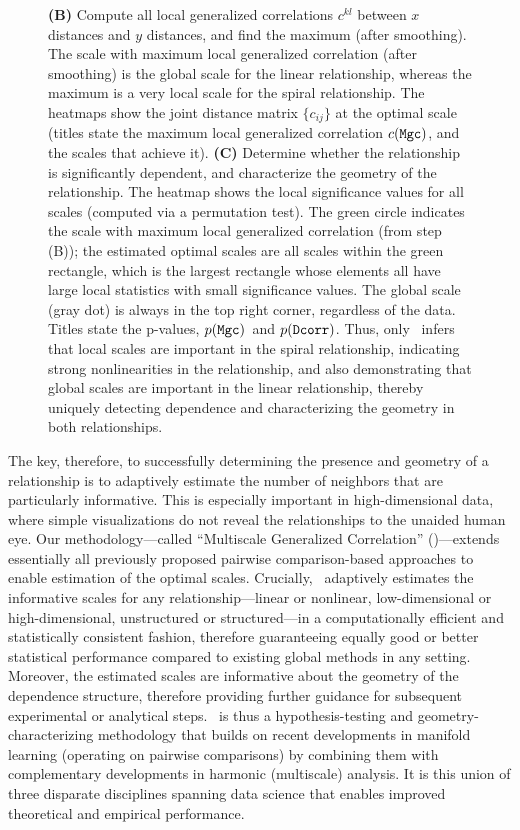 \documentclass[11pt]{extarticle}
\begin{document}
\begin{figure}
{%
\textbf{(B)} Compute all local generalized correlations $c^{kl}$ between $x$ distances and $y$ distances, and find the maximum (after smoothing).
The scale with maximum local generalized correlation (after smoothing) is the global scale for the linear relationship, whereas the maximum is a very local scale for the spiral relationship. The heatmaps show the joint distance matrix $\{c_{ij}\}$ at the optimal scale (titles state the maximum local generalized correlation $c({\sc \texttt{Mgc}})$, and the scales that achieve it).
\textbf{(C)}
Determine whether the relationship is significantly dependent, and characterize the geometry of the relationship.
The heatmap shows the local  significance values for all scales (computed via a permutation test). The green circle indicates the scale with maximum local generalized correlation (from step (B));  the estimated optimal scales are all scales within the green rectangle, which is the largest rectangle whose elements all have large local statistics with small significance values. The global scale (gray dot) is always in the top right corner, regardless of the data.
Titles state the p-values,  $p({\sc \texttt{Mgc}})$~and $p({\sc \texttt{Dcorr}})$.
Thus, only \Mgc~infers that local scales are important in the spiral relationship, indicating strong nonlinearities in the relationship,
 and also demonstrating that global scales are important in the linear relationship,  thereby uniquely detecting dependence and characterizing the geometry in both relationships.
}
\label{f:newschem}
\end{figure}

The key, therefore, to successfully determining the presence and geometry of a relationship is to adaptively estimate the number of neighbors that are particularly informative.
This is especially important in high-dimensional data, where simple visualizations do not reveal the relationships to the unaided human eye.
Our methodology---called ``Multiscale Generalized Correlation'' (\Mgc)---extends essentially all previously proposed pairwise comparison-based approaches to enable estimation of the  optimal scales.
Crucially, \Mgc~adaptively estimates the informative scales for any relationship---linear or nonlinear, low-dimensional or high-dimensional, unstructured or structured---in a computationally efficient and statistically consistent fashion, therefore guaranteeing equally good or better  statistical performance compared to existing global methods in any setting.
Moreover, the estimated scales are informative about the geometry of the dependence structure, therefore providing further guidance for subsequent experimental or analytical steps. \Mgc~is thus a hypothesis-testing and geometry-characterizing methodology that builds on recent developments in manifold learning (operating on pairwise comparisons) by combining them with complementary developments in harmonic (multiscale) analysis.
It is this union of three disparate disciplines spanning data science that enables improved theoretical and empirical performance.
\end{document}
